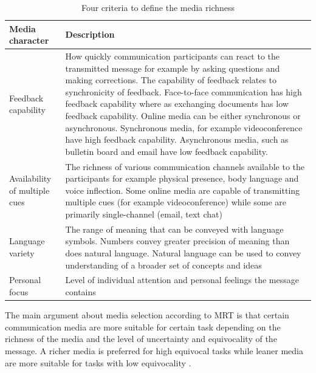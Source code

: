 \documentclass[english,12pt,a4paper,pdftex]{article}
\begin{document}
\begin{table}[!h]
\renewcommand{\arraystretch}{1.3}
\caption{Four criteria to define the media richness \citep{graveline2000} \citep{daft1987}}
\label{table:criteria_media_richness}
\centering
\begin{tabular}{|p{4cm}|p{10cm}|}
\hline
\textbf{Media character} & \textbf{Description}\\
\hline
Feedback capability & How quickly communication participants can react to the transmitted message for example by asking questions and making corrections. The capability of feedback relates to synchronicity of feedback. Face-to-face communication has high feedback capability where as exchanging documents has low feedback capability. Online media can be either synchronous or asynchronous. Synchronous media, for example videoconference have high feedback capability. Asynchronous media, such as bulletin board and email have low feedback capability. \\
\hline
Availability of multiple cues & The richness of various communication channels available to the participants for example physical presence, body language and voice inflection. Some online media are capable of transmitting multiple cues (for example videoconference) while some are primarily single-channel (email, text chat) \\
\hline
Language variety & The range of meaning that can be conveyed with language symbols. Numbers convey greater precision of meaning than does natural language. Natural language can be used to convey understanding of a broader set of concepts and ideas \\
\hline
Personal focus & Level of individual attention and personal feelings the message contains \\
\hline
\end{tabular}
\end{table}

The main argument about media selection according to \ac{MRT} is that certain communication media are more suitable for certain task depending on the richness of the media and the level of uncertainty and equivocality of the message. A richer media is preferred for high equivocal tasks while leaner media are more suitable for tasks with low equivocality \citep{daft1987}.
\end{document}
